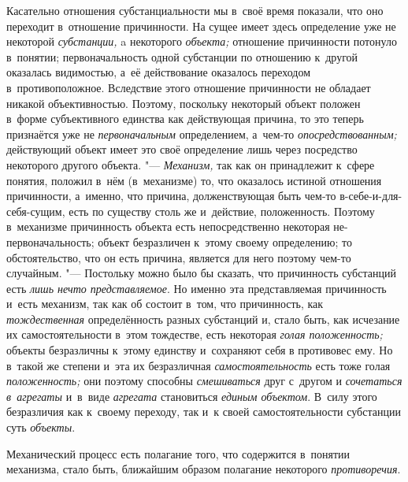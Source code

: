 Касательно отношения субстанциальности мы в~своё время
показали, что оно переходит в~отношение причинности. На сущее имеет здесь
определение уже не некоторой {\em субстанции,} a некоторого {\em объекта;}
отношение причинности потонуло в~понятии; первоначальность
одной субстанции по отношению к~другой оказалась видимостью, а~её
действование оказалось переходом в~противоположное. Вследствие этого
отношение причинности не обладает никакой объективностью. Поэтому,
поскольку некоторый объект положен в~форме субъективного единства как
действующая причина, то это теперь признаётся уже не {\em первоначальным}
определением, а~чем-то {\em опосредствованным;}
действующий объект имеет это своё определение лишь через
посредство некоторого другого объекта. "--- {\em Механизм,} так как он
принадлежит к~сфере понятия, положил в~нём (в~механизме) то, что оказалось
истиной отношения причинности, а~именно, что причина, долженствующая быть
чем-то в-себе-и-для-себя-сущим, есть по существу столь же и~действие,
положенность. Поэтому в~механизме причинность объекта есть непосредственно
некоторая не-первоначальность; объект безразличен к~этому своему
определению; то обстоятельство, что он есть причина, является для него
поэтому чем-то случайным. "--- Постольку можно было бы сказать,
что причинность субстанций есть {\em лишь нечто представляемое}.
Но именно эта представляемая причинность и~есть механизм, так
как об состоит в~том, что причинность, как {\em тождественная}
определённость разных субстанций и, стало быть, как исчезание
их самостоятельности в~этом тождестве, есть некоторая {\em голая положенность;}
объекты безразличны к~этому единству и~сохраняют себя в
противовес ему. Но в~такой же степени и~эта их безразличная
{\em самостоятельность} есть тоже голая {\em положенность;} они
поэтому способны {\em смешиваться} друг с~другом и {\em сочетаться в~агрегаты}
и~в~виде {\em агрегата} становиться {\em единым
объектом}. В~силу этого безразличия как к~своему переходу,
так и~к своей самостоятельности субстанции суть {\em объекты}.


Механический процесс есть полагание того, что содержится в~понятии механизма,
стало быть, ближайшим образом полагание некоторого {\em противоречия}.

